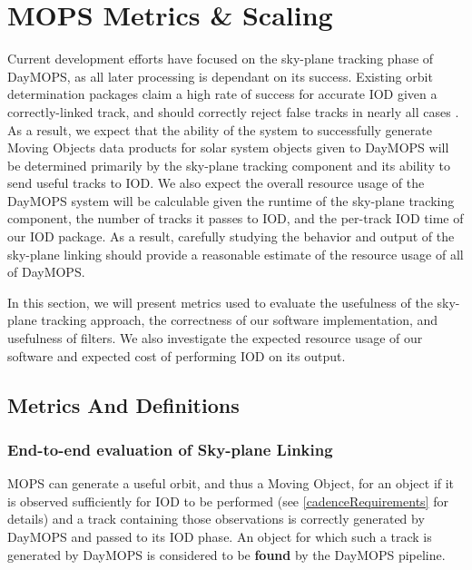 \documentclass[12pt,preprint]{aastex}
\begin{document}
\section{MOPS Metrics \& Scaling}

Current development efforts have focused on the sky-plane tracking
phase of DayMOPS, as all later processing is dependant on its
success. Existing orbit determination packages claim a high rate of
success for accurate IOD given a correctly-linked track, and should
correctly reject false tracks in nearly all cases
\citep{Milani2006}. As a result, we expect that the ability of the
system to successfully generate Moving Objects data products for solar
system objects given to DayMOPS will be determined primarily by the
sky-plane tracking component and its ability to send useful tracks to
IOD.  We also expect the overall resource usage of the DayMOPS system
will be calculable given the runtime of the sky-plane tracking
component, the number of tracks it passes to IOD, and the per-track
IOD time of our IOD package.  As a result, carefully studying the
behavior and output of the sky-plane linking should provide a
reasonable estimate of the resource usage of all of DayMOPS.


In this section, we will present metrics used to evaluate the
usefulness of the sky-plane tracking approach, the correctness of our
software implementation, and usefulness of filters. We also
investigate the expected resource usage of our software and expected cost
of performing IOD on its output.



\subsection{Metrics And Definitions}

\subsubsection{End-to-end evaluation of Sky-plane Linking}
MOPS can generate a useful orbit, and thus a Moving Object, for an
object if it is observed sufficiently for IOD to be performed (see
\ref{cadenceRequirements} for details) and a track containing those
observations is correctly generated by DayMOPS and passed to its IOD
phase.  An object for which such a track is generated by DayMOPS is
considered to be \textbf{found} by the DayMOPS pipeline.  
\end{document}
